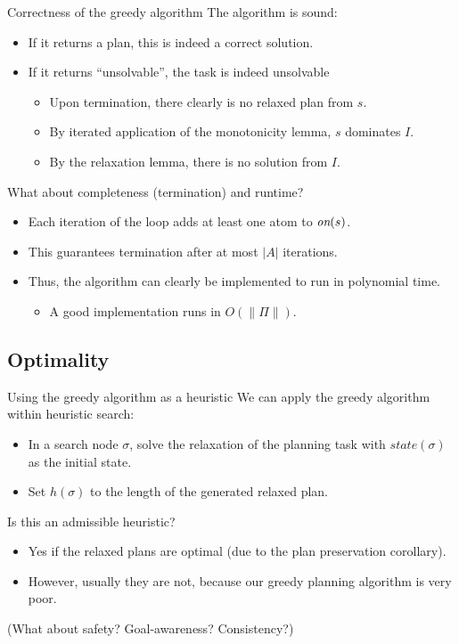 \documentclass{gkibeamer}
\begin{document}
\begin{frame}{Correctness of the greedy algorithm}
  The algorithm is \alert{sound}:
  \begin{itemize}
  \item If it returns a plan, this is indeed a correct solution.
  \item If it returns ``unsolvable'', the task is indeed unsolvable
    \begin{itemize}
    \item Upon termination, there clearly is no relaxed plan from
      $s$.
    \item By iterated application of the monotonicity lemma, $s$
      dominates $I$.
    \item By the relaxation lemma, there is no solution from $I$.
    \end{itemize}
  \end{itemize}
  
  \bigskip
  
  What about \alert{completeness} (termination) and \alert{runtime}?
  \begin{itemize}
  \item Each iteration of the loop adds at least one atom to
    $\textit{on}(s)$.
  \item This guarantees termination after at most $|A|$ iterations.
  \item Thus, the algorithm can clearly be implemented to run in
    polynomial time.
    \begin{itemize}
    \item A good implementation runs in $O(\|\Pi\|)$.
    \end{itemize}
  \end{itemize}
\end{frame}

\subsection{Optimality}

\begin{frame}{Using the greedy algorithm as a heuristic}
  We can apply the greedy algorithm within heuristic search:
  \begin{itemize}
  \item In a search node $\sigma$, solve the relaxation of the
    planning task with $\textit{state}(\sigma)$ as the initial state.
  \item Set $h(\sigma)$ to the length of the generated relaxed plan.
  \end{itemize}
  
  \medskip

  Is this an \alert{admissible} heuristic?
  \begin{itemize}
  \item Yes if the relaxed plans are \alert{optimal} (due to the
    plan preservation corollary).
  \item However, usually they are not, because our greedy planning
    algorithm is very poor.
  \end{itemize}

  (What about safety? Goal-awareness? Consistency?)
\end{frame}
\end{document}

